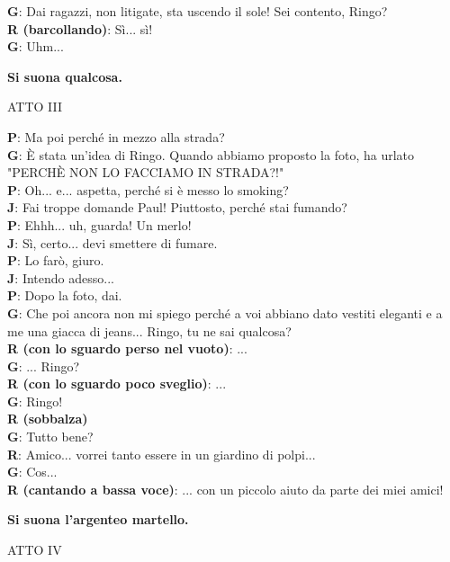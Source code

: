 \documentclass{article}
\begin{document}
{\bf G}: Dai ragazzi, non litigate, sta uscendo il sole! Sei contento, Ringo?\\
{\bf R (barcollando)}: Sì... sì!\\
{\bf G}: Uhm...
\begin{center}
{\bf Si suona qualcosa.\\}
\end{center}
\vspace{0.3cm}
\newpage
\begin{center}
{\large ATTO III\\}
\end{center}
{\bf P}: Ma poi perché in mezzo alla strada?\\
{\bf G}: È stata un'idea di Ringo. Quando abbiamo proposto la foto, ha urlato "PERCHÈ NON LO FACCIAMO IN STRADA?!"\\
{\bf P}: Oh... e... aspetta, perché si è messo lo smoking?\\
{\bf J}: Fai troppe domande Paul! Piuttosto, perché stai fumando?\\
{\bf P}: Ehhh... uh, guarda! Un merlo!\\
{\bf J}: Sì, certo... devi smettere di fumare.\\
{\bf P}: Lo farò, giuro.\\
{\bf J}: Intendo adesso...\\
{\bf P}: Dopo la foto, dai.\\
{\bf G}: Che poi ancora non mi spiego perché a voi abbiano dato vestiti eleganti e a me una giacca di jeans... Ringo, tu ne sai qualcosa?\\
{\bf R (con lo sguardo perso nel vuoto)}: ...\\
{\bf G}: ... Ringo?\\
{\bf R (con lo sguardo poco sveglio)}: ...\\
{\bf G}: Ringo!\\
{\bf R (sobbalza)}\\
{\bf G}: Tutto bene?\\
{\bf R}: Amico... vorrei tanto essere in un giardino di polpi...\\
{\bf G}: Cos...\\
{\bf R (cantando a bassa voce)}: ... con un piccolo aiuto da parte dei miei amici!\\
\begin{center}
{\bf Si suona l'argenteo martello.\\}
\end{center}
\vspace{0.3cm}
\begin{center}
{\large ATTO IV\\}
\end{center}
\end{document}
